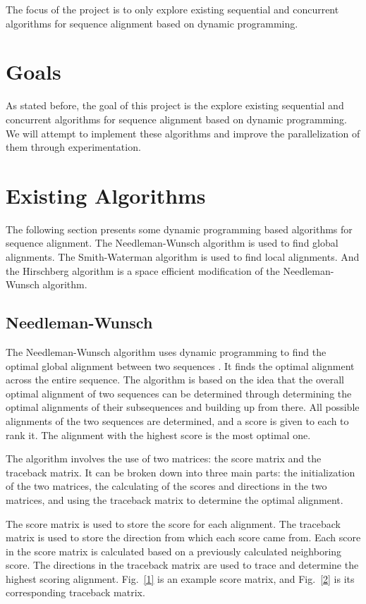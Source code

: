\documentclass[conference]{IEEEtran}
\begin{document}
The focus of the project is to only explore existing sequential and concurrent algorithms for sequence alignment based on dynamic programming.

\section{Goals}
As stated before, the goal of this project is the explore existing sequential and concurrent algorithms for sequence alignment based on dynamic programming. We will attempt to implement these algorithms and improve the parallelization of them through experimentation.

\section{Existing Algorithms}
The following section presents some dynamic programming based algorithms for sequence alignment. The Needleman-Wunsch algorithm is used to find global alignments. The Smith-Waterman algorithm is used to find local alignments. And the Hirschberg algorithm is a space efficient modification of the Needleman-Wunsch algorithm.

\subsection{Needleman-Wunsch}
The Needleman-Wunsch algorithm uses dynamic programming to find the optimal global alignment between two sequences \cite{vladimir}. It finds the optimal alignment across the entire sequence. The algorithm is based on the idea that the overall optimal alignment of two sequences can be determined through determining the optimal alignments of their subsequences and building up from there. All possible alignments of the two sequences are determined, and a score is given to each to rank it. The alignment with the highest score is the most optimal one.

The algorithm involves the use of two matrices: the score matrix and the traceback matrix. It can be broken down into three main parts: the initialization of the two matrices, the calculating of the scores and directions in the two matrices, and using the traceback matrix to determine the optimal alignment.

The score matrix is used to store the score for each alignment. The traceback matrix is used to store the direction from which each score came from. Each score in the score matrix is calculated based on a previously calculated neighboring score. The directions in the traceback matrix are used to trace and determine the highest scoring alignment. Fig.~\ref{1} is an example score matrix, and Fig.~\ref{2} is its corresponding traceback matrix.
\end{document}
